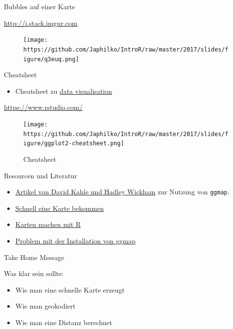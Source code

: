 \documentclass[ignorenonframetext,]{beamer}
\providecommand{\tightlist}{%
\setlength{\itemsep}{0pt}\setlength{\parskip}{0pt}}
\begin{document}
\begin{frame}{Bubbles auf einer Karte}

\url{http://i.stack.imgur.com}

\begin{figure}[htbp]
\centering
\texttt{[image: https://github.com/Japhilko/IntroR/raw/master/2017/slides/figure/q3euq.png]}
\caption{}
\end{figure}

\end{frame}

\begin{frame}{Cheatsheet}

\begin{itemize}
\tightlist
\item
  Cheatsheet zu
  \href{https://www.rstudio.com/wp-content/uploads/2015/04/ggplot2-cheatsheet.pdf}{data
  visualisation}
\end{itemize}

\url{https://www.rstudio.com/}

\begin{figure}[htbp]
\centering
\texttt{[image: https://github.com/Japhilko/IntroR/raw/master/2017/slides/figure/ggplot2-cheatsheet.png]}
\caption{Cheatsheet}
\end{figure}

\end{frame}

\begin{frame}[fragile]{Resourcen und Literatur}

\begin{itemize}
\item
  \href{http://journal.r-project.org/archive/2013-1/kahle-wickham.pdf}{Artikel
  von David Kahle und Hadley Wickham} zur Nutzung von \texttt{ggmap}.
\item
  \href{http://rpackages.ianhowson.com/cran/ggmap/man/get_map.html}{Schnell
  eine Karte bekommen}
\item
  \href{http://www.kevjohnson.org/making-maps-in-r-part-2/}{Karten
  machen mit R}
\item
  \href{http://stackoverflow.com/questions/40642850/ggmap-error-geomrasterann-was-built-with-an-incompatible-version-of-ggproto}{Problem
  mit der Installation von ggmap}
\end{itemize}

\end{frame}

\begin{frame}{Take Home Message}

Was klar sein sollte:

\begin{itemize}
\tightlist
\item
  Wie man eine schnelle Karte erzeugt
\item
  Wie man geokodiert
\item
  Wie man eine Distanz berechnet
\end{itemize}

\end{frame}
\end{document}
